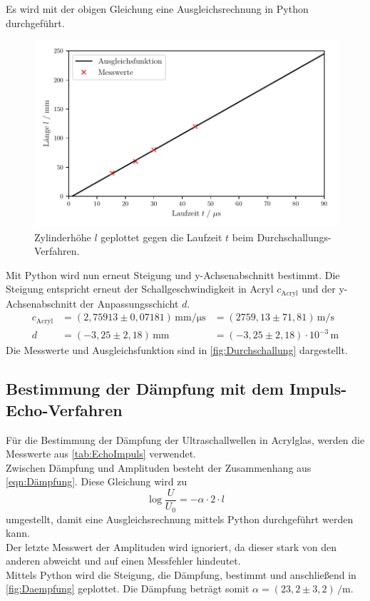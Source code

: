   Es wird mit der obigen Gleichung eine Ausgleichsrechnung in Python durchgeführt.\\
  \begin{figure}
    \centering
    \includegraphics[width=15cm]{messwerte/Durchschallung.pdf}
    \caption{Zylinderhöhe $l$ geplottet gegen die Laufzeit $t$ beim Durchschallungs-Verfahren.}
    \label{fig:Durchschallung}
  \end{figure}
  Mit Python wird nun erneut Steigung und y-Achsenabschnitt bestimmt. Die Steigung entspricht erneut der 
  Schallgeschwindigkeit in Acryl $c_{\mathrm{Acryl}}$ und der y-Achsenabschnitt der Anpassungsschicht $d$.
  \begin{align*}
    c_{\mathrm{Acryl}} &= (2,75913 \pm 0,07181) \, \si{\milli\meter\per\micro\second} &= (2759,13 \pm 71,81) \, \si{\meter\per\second} \\
    d &= (-3,25 \pm 2,18) \, \si{\milli\meter} &= (-3,25 \pm 2,18) \cdot 10^{-3} \, \si{\meter}
  \end{align*}
  Die Messwerte und Ausgleichsfunktion sind in \autoref{fig:Durchschallung} dargestellt.

\subsection{Bestimmung der Dämpfung mit dem Impuls-Echo-Verfahren}

  Für die Bestimmung der Dämpfung der Ultraschallwellen in Acrylglas, werden die Messwerte 
  aus \autoref{tab:EchoImpuls} verwendet.\\
  Zwischen Dämpfung und Amplituden besteht der Zusammenhang aus \autoref{eqn:Dämpfung}. Diese Gleichung wird
  zu
  \begin{equation*}
    \log{\frac{U}{U_0}} = -\alpha \cdot 2 \cdot l
  \end{equation*}
  umgestellt, damit eine Ausgleichsrechnung mittels Python durchgeführt werden kann.\\
  Der letzte Messwert der Amplituden wird ignoriert, da dieser stark von den anderen abweicht und auf einen
  Messfehler hindeutet.\\
  Mittels Python wird die Steigung, die Dämpfung, bestimmt und anschließend in \autoref{fig:Daempfung} geplottet.
  Die Dämpfung beträgt somit $\alpha = (23,2 \pm 3,2) \, \si{\per\meter}$.

